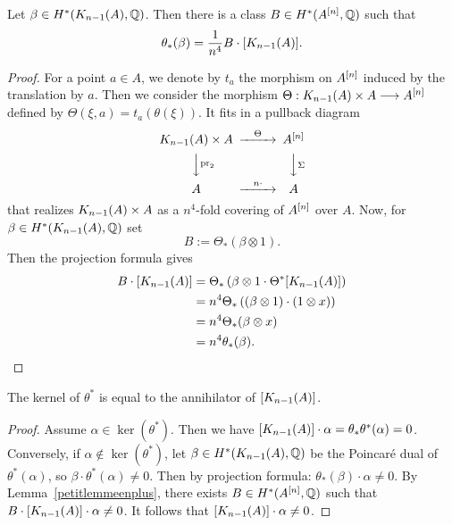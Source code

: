 \begin{lemma}\label{petitlemmeenplus}
 Let $\beta\in H^*(K_{n-1}(A),\Q)$. Then there is a class $B\in H^{*}(A\hilb{n},\Q)$ such that 
 $$\theta_*(\beta)=\frac{1}{n^4}B\cdot [\kum{A}{n-1}].$$
\end{lemma}
\begin{proof}
For a point $a\in A$, we denote by $t_a$ the morphism on $A\hilb{n}$ induced by the translation by $a$.
Then we consider the morphism $\Theta :\kum{A}{n-1}\times A \longrightarrow A\hilb{n}$ defined by $\Theta(\xi,a)=t_a(\theta(\xi))$. It fits in a pullback diagram
\begin{equation}
\begin{CD}
\kum{A}{n-1}\times A @>\Theta >> A\hilb{n}\\
@VV\pr_2V @VV\Sigma V\\
A @> n\cdot >> A
\end{CD}
\end{equation}
that realizes $\kum{A}{n-1}\times A$ as a $n^4$-fold covering of $A\hilb{n}$ over $A$.
Now, for $\beta\in H^*(K_{n-1}(A),\Q)$ set
$$
B:=\Theta_*(\beta\otimes 1).
$$
Then the projection formula gives
\begin{align*}
B\cdot [K_{n-1}(A)]&= \Theta_*\left(\beta\otimes 1\cdot \Theta^*[\kum{A}{n-1}]\right) \\
&=n^4 \Theta_*\left((\beta\otimes 1)\cdot  (1\otimes x)\right)\\
&=n^4 \Theta_*(\beta \otimes x)\\
&=n^4\theta_*(\beta).
\qedhere
\end{align*}
\end{proof}

\begin{proposition}\label{annihilator}
The kernel of $\theta^*$ is equal to the annihilator of $[\kum{A}{n-1}]$.
\end{proposition}
\begin{proof}
Assume $\alpha\in \ker(\theta^*)$. Then we have
$
[\kum{A}{n-1}]\cdot \alpha = \theta_*\theta^*(\alpha) = 0
$. 
Conversely, if $\alpha\notin \ker(\theta^*)$,
let $\beta\in H^*(\kum{A}{n-1},\Q)$ be the Poincar\'e dual of $\theta^*(\alpha)$, so $\beta\cdot \theta^*(\alpha)\neq 0$.
Then by projection formula:
$
\theta_*(\beta)\cdot \alpha\neq 0.
$
By Lemma~\ref{petitlemmeenplus}, there exists $B\in H^*(A\hilb{n},\Q)$ such that 
$B\cdot [\kum{A}{n-1}]\cdot \alpha\neq 0$. It follows that $ [\kum{A}{n-1}]\cdot \alpha\neq 0$.
\end{proof}

